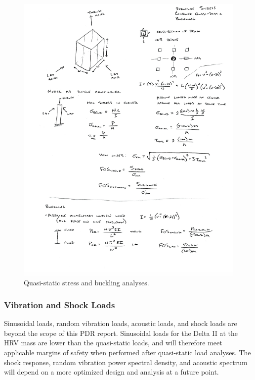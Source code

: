 \documentclass[paper=letter, fontsize=11pt]{scrartcl} %
\numberwithin{equation}{section} %
\numberwithin{figure}{section} %
\numberwithin{table}{section} %
\begin{document}
\begin{figure}[H]
    \begin{center}
        \includegraphics[width=1\textwidth]{Pics/stressbuckl.png}
        \caption{Quasi-static stress and buckling analyses.}
        \label{fig:p8}
    \end{center}
\end{figure}

\subsubsection{Vibration and Shock Loads}
Sinusoidal loads, random vibration loads, acoustic loads, and shock loads are beyond the scope of this PDR report. Sinusoidal loads for the Delta II at the HRV mass are lower than the quasi-static loads, and will therefore meet applicable margins of safety when performed after quasi-static load analyses. The shock response, random vibration power spectral density, and acoustic spectrum will depend on a more optimized design and analysis at a future point.
\end{document}
